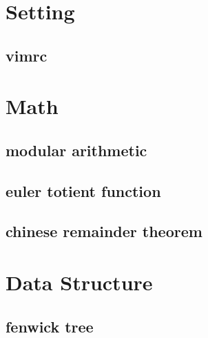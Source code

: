 \documentclass[10pt,landscape,a4paper,twocolumn]{article}
\begin{document}
\section{Setting}
\subsection{vimrc}



\section{Math}

\subsection{modular arithmetic}

\subsection{euler totient function}

\subsection{chinese remainder theorem}



\section{Data Structure}

\subsection{fenwick tree}
\end{document}
